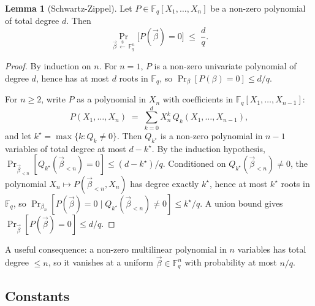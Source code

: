\documentclass{article}
\theoremstyle{definition}
\newcommand{\Fq}{\mathbb F_q}
\newtheorem{lemma}{Lemma}
\begin{document}
\begin{lemma}[Schwartz-Zippel]\label{lem:sz}
Let $P \in \Fq[X_1, \ldots, X_n]$ be a non-zero polynomial of total degree $d$. Then
\[
\Pr_{\vec\beta \,\overset{\$}{\leftarrow}\, \Fq^n}\big[P(\vec\beta) = 0\big] \;\leq\; \frac{d}{q}.
\]
\end{lemma}
\begin{proof}
By induction on $n$. For $n = 1$, $P$ is a non-zero univariate polynomial of degree $d$, hence has at most $d$ roots in $\Fq$, so $\Pr_\beta[P(\beta) = 0] \leq d/q$.

For $n \geq 2$, write $P$ as a polynomial in $X_n$ with coefficients in $\Fq[X_1, \ldots, X_{n-1}]$:
\[
P(X_1, \ldots, X_n) \;=\; \sum_{k=0}^{d} X_n^k \, Q_k(X_1, \ldots, X_{n-1}),
\]
and let $k^\star = \max\{k : Q_k \neq 0\}$. Then $Q_{k^\star}$ is a non-zero polynomial in $n-1$ variables of total degree at most $d - k^\star$. By the induction hypothesis, $\Pr_{\vec\beta_{<n}}[Q_{k^\star}(\vec\beta_{<n}) = 0] \leq (d - k^\star)/q$. Conditioned on $Q_{k^\star}(\vec\beta_{<n}) \neq 0$, the polynomial $X_n \mapsto P(\vec\beta_{<n}, X_n)$ has degree exactly $k^\star$, hence at most $k^\star$ roots in $\Fq$, so $\Pr_{\beta_n}[P(\vec\beta) = 0 \mid Q_{k^\star}(\vec\beta_{<n}) \neq 0] \leq k^\star/q$. A union bound gives $\Pr_{\vec\beta}[P(\vec\beta) = 0] \leq d/q$.
\end{proof}

A useful consequence: a non-zero multilinear polynomial in $n$ variables has total degree $\leq n$, so it vanishes at a uniform $\vec\beta \in \Fq^n$ with probability at most $n/q$. 

\subsection{Constants}
\end{document}
